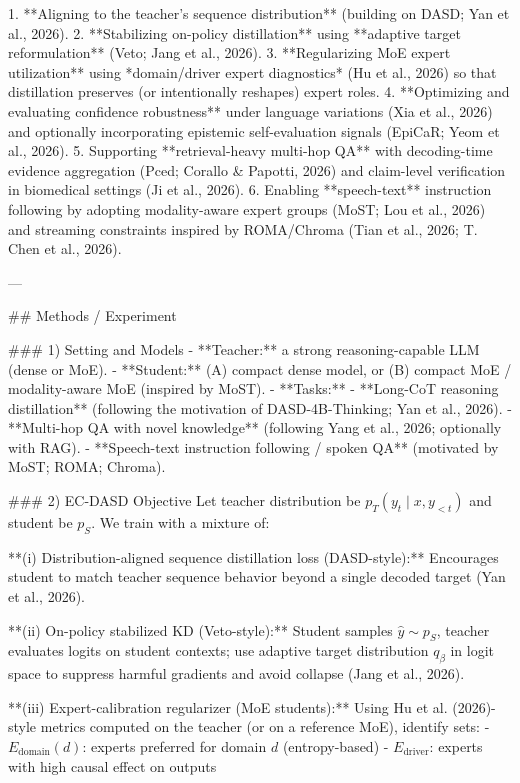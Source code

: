 1. **Aligning to the teacher’s sequence distribution** (building on DASD; Yan et al., 2026).  
2. **Stabilizing on-policy distillation** using **adaptive target reformulation** (Veto; Jang et al., 2026).  
3. **Regularizing MoE expert utilization** using *domain/driver expert diagnostics* (Hu et al., 2026) so that distillation preserves (or intentionally reshapes) expert roles.  
4. **Optimizing and evaluating confidence robustness** under language variations (Xia et al., 2026) and optionally incorporating epistemic self-evaluation signals (EpiCaR; Yeom et al., 2026).  
5. Supporting **retrieval-heavy multi-hop QA** with decoding-time evidence aggregation (Pced; Corallo & Papotti, 2026) and claim-level verification in biomedical settings (Ji et al., 2026).  
6. Enabling **speech-text** instruction following by adopting modality-aware expert groups (MoST; Lou et al., 2026) and streaming constraints inspired by ROMA/Chroma (Tian et al., 2026; T. Chen et al., 2026).

---

## Methods / Experiment  

### 1) Setting and Models  
- **Teacher:** a strong reasoning-capable LLM (dense or MoE).  
- **Student:** (A) compact dense model, or (B) compact MoE / modality-aware MoE (inspired by MoST).  
- **Tasks:**  
  - **Long-CoT reasoning distillation** (following the motivation of DASD-4B-Thinking; Yan et al., 2026).  
  - **Multi-hop QA with novel knowledge** (following Yang et al., 2026; optionally with RAG).  
  - **Speech-text instruction following / spoken QA** (motivated by MoST; ROMA; Chroma).  

### 2) EC-DASD Objective  
Let teacher distribution be \(p_T(y_t \mid x, y_{<t})\) and student be \(p_S\). We train with a mixture of:

**(i) Distribution-aligned sequence distillation loss (DASD-style):**  
Encourages student to match teacher sequence behavior beyond a single decoded target (Yan et al., 2026).

**(ii) On-policy stabilized KD (Veto-style):**  
Student samples \( \hat{y} \sim p_S\), teacher evaluates logits on student contexts; use adaptive target distribution \(q_\beta\) in logit space to suppress harmful gradients and avoid collapse (Jang et al., 2026).

**(iii) Expert-calibration regularizer (MoE students):**  
Using Hu et al. (2026)-style metrics computed on the teacher (or on a reference MoE), identify sets:
- \(E_{\text{domain}}(d)\): experts preferred for domain \(d\) (entropy-based)  
- \(E_{\text{driver}}\): experts with high causal effect on outputs  

